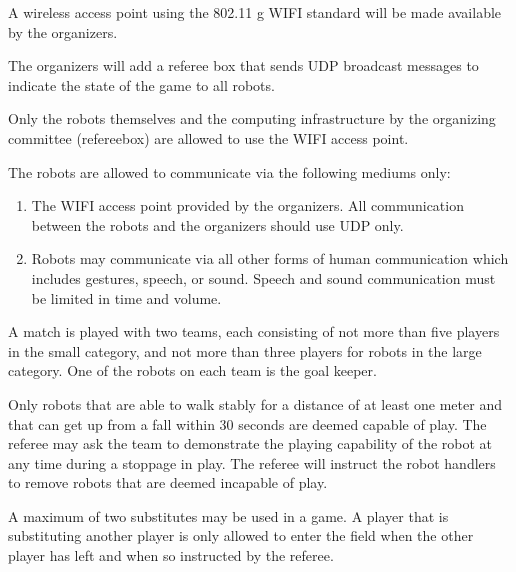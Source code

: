 \documentclass[12pt]{hurocup}
\begin{document}
\label{law:communication}

\begin{lawlist}[US]

\item A wireless access point using the 802.11 g WIFI standard will be
  made available by the organizers.

\item The organizers will add a referee box that sends UDP broadcast
  messages to indicate the state of the game to all robots.

\item Only the robots themselves and the computing infrastructure by
  the organizing committee (refereebox) are allowed to use the WIFI
  access point.

\item The robots are allowed to communicate via the following mediums
  only:
  \begin{enumerate}
  \item The WIFI access point provided by the organizers. All
    communication between the robots and the organizers should use
    UDP only.
  \item Robots may communicate via all other forms of human
    communication which includes gestures, speech, or sound. Speech
    and sound communication must be limited in time and volume.
  \end{enumerate}

\end{lawlist}


\begin{lawlist}[US]
\item A match is played with two teams, each consisting of not more
  than five players in the small category, and not more than three
  players for robots in the large category. One of the robots on each
  team is the goal keeper.

\item Only robots that are able to walk stably for a distance of at
  least one meter and that can get up from a fall within 30 seconds
  are deemed capable of play. The referee may ask the team to
  demonstrate the playing capability of the robot at any time during a
  stoppage in play. The referee will instruct the robot handlers to
  remove robots that are deemed incapable of play.

\item A maximum of two substitutes may be used in a game. A player
  that is substituting another player is only allowed to enter the
  field when the other player has left and when so instructed by the
  referee.

\end{lawlist}
\end{document}
